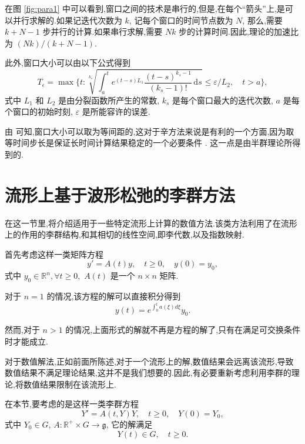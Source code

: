 在图 \ref{fig:para1} 中可以看到,窗口之间的技术是串行的,但是,在每个``箭头''上,是可以并行求解的.如果记迭代次数为 $k$, 记每个窗口的时间节点数为 $N$, 那么,需要 $k+N-1$ 步并行的计算.如果串行求解,需要 $Nk$ 步的计算时间.因此,理论的加速比为 $(Nk)/(k+N-1)$.

此外,窗口大小可以由以下公式得到 \cite{jiang2006windowing}
\begin{equation*}
  T_\epsilon=\max\Bigg\{t:\sqrt[k_s]{\int_a^te^{(t-s)L_1}\frac{(t-s)^{k_s-1}}{(k_s-1)!}\,\mathrm{d}s}\le \varepsilon/L_2,\quad t>a\Bigg\},
\end{equation*}
式中 $L_1$ 和 $L_2$ 是由分裂函数所产生的常数, $k_s$ 是每个窗口最大的迭代次数, $a$ 是每个窗口的初始时刻, $\varepsilon$ 是所能容许的误差.

由 \cite{jiang2006windowing} 可知,窗口大小可以取为等间距的,这对于辛方法来说是有利的一个方面,因为取等时间步长是保证长时间计算结果稳定的一个必要条件 \cite{hairer2006geometric}. 这一点是由半群理论所得到的.

\section{流形上基于波形松弛的李群方法}\label{sec:04wrmani}

在这一节里,将介绍适用于一些特定流形上计算的数值方法.该类方法利用了在流形上的作用的李群结构,和其相切的线性空间,即李代数,以及指数映射.

首先考虑这样一类矩阵方程
\begin{equation*}
	y'=A(t)y,\quad t\geq 0,\quad y(0)=y_0,
\end{equation*}
式中 $y_0\in \mathbb{R}^n,\forall t \geq 0,$ $A(t)$ 是一个 $n\times n$ 矩阵.

对于 $n=1$ 的情况,该方程的解可以直接积分得到
\begin{equation*}
	y(t)=e^{\int_0^ta(\xi)d\xi}y_0.
\end{equation*}

然而,对于 $n>1$ 的情况,上面形式的解就不再是方程的解了,只有在满足可交换条件时才能成立.

对于数值解法,正如前面所陈述,对于一个流形上的解,数值结果会远离该流形,导致数值结果不满足理论结果,这并不是我们想要的.因此,有必要重新考虑利用李群的理论,将数值结果限制在该流形上.

在本节,要考虑的是这样一类李群方程
\begin{equation*}
	Y'=A(t,Y)Y,\quad t\geq 0,\quad Y(0)=Y_0,
\end{equation*}
式中 $Y_0\in G $, $A:\mathbb{R}^+\times G\to \mathfrak{g}$, 它的解满足
\begin{equation*}
	Y(t)\in G,\quad t\geq 0.
\end{equation*}

